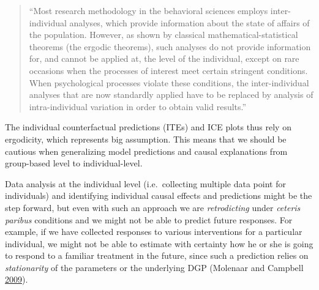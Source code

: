 \documentclass[
]{book}
\begin{document}
\begin{quote}
``Most research methodology in the behavioral sciences employs inter-individual analyses, which provide information about the state of affairs of the population. However, as shown by classical mathematical-statistical theorems (the ergodic theorems), such analyses do not provide information for, and cannot be applied at, the level of the individual, except on rare occasions when the processes of interest meet certain stringent conditions. When psychological processes violate these conditions, the inter-individual analyses that are now standardly applied have to be replaced by analysis of intra-individual variation in order to obtain valid results.''
\end{quote}

The individual counterfactual predictions (ITEs) and ICE plots thus rely on ergodicity, which represents big assumption. This means that we should be cautious when generalizing model predictions and causal explanations from group-based level to individual-level.

Data analysis at the individual level (i.e.~collecting multiple data point for individuals) and identifying individual causal effects and predictions might be the step forward, but even with such an approach we are \emph{retrodicting} under \emph{ceteris paribus} conditions and we might not be able to predict future responses. For example, if we have collected responses to various interventions for a particular individual, we might not be able to estimate with certainty how he or she is going to respond to a familiar treatment in the future, since such a prediction relies on \emph{stationarity} of the parameters or the underlying DGP (Molenaar and Campbell \protect\hyperlink{ref-molenaarNewPersonSpecificParadigm2009}{2009}).
\end{document}
